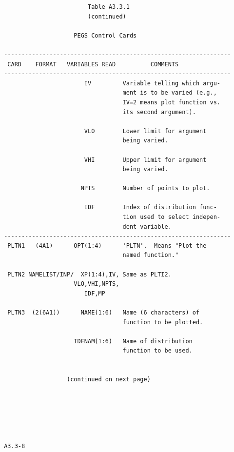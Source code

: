 \newpage {} \begin{verbatim}
                         Table A3.3.1
                         (continued)
 
                     PEGS Control Cards
 
 -----------------------------------------------------------------
  CARD    FORMAT   VARIABLES READ          COMMENTS
 -----------------------------------------------------------------
                        IV         Variable telling which argu-
                                   ment is to be varied (e.g.,
                                   IV=2 means plot function vs.
                                   its second argument).
 
                        VLO        Lower limit for argument
                                   being varied.
 
                        VHI        Upper limit for argument
                                   being varied.
 
                       NPTS        Number of points to plot.
 
                        IDF        Index of distribution func-
                                   tion used to select indepen-
                                   dent variable.
 -----------------------------------------------------------------
  PLTN1   (4A1)      OPT(1:4)      'PLTN'.  Means "Plot the
                                   named function."
 
  PLTN2 NAMELIST/INP/  XP(1:4),IV, Same as PLTI2.
                     VLO,VHI,NPTS,
                        IDF,MP
 
  PLTN3  (2(6A1))      NAME(1:6)   Name (6 characters) of
                                   function to be plotted.
 
                     IDFNAM(1:6)   Name of distribution
                                   function to be used.

 
                   (continued on next page)



 
 
 
 A3.3-8
\end{verbatim} 
